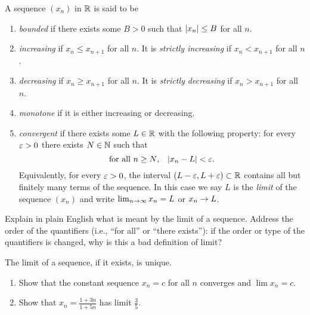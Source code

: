 \documentclass{book}
\begin{document}
\begin{defn}
A sequence $(x_n)$ in $\mathbb{R}$ is said to be 
\begin{enumerate}
\item {\em bounded} if there exists some $B > 0$ such that $\lvert x_n\rvert \leq B$ for all $n$.
\item {\em increasing} if $x_n \leq x_{n+1}$ for all $n$. It is {\em strictly increasing} if $x_n < x_{n+1}$ for all $n$. 
\item {\em decreasing} if $x_n \geq x_{n+1}$ for all $n$. It is {\em strictly decreasing} if $x_n > x_{n+1}$ for all $n$. 
\item {\em monotone} if it is either increasing or decreasing.
\item {\em convergent} if there exists some $L \in \mathbb{R}$ with the following property: for every $\varepsilon > 0$ there exists $N \in \mathbb{N}$ such that
\[
	\text{for all $n \geq N$,} 
	\quad 
	\lvert x_n - L\rvert < \varepsilon.
\]
Equivalently, for every $\varepsilon > 0$, the interval $(L - \varepsilon, L + \varepsilon) \subset \mathbb{R}$ contains all but finitely many terms of the sequence.
In this case we say $L$ is the {\em limit} of the sequence $(x_n)$ and write 
$\lim_{n\rightarrow\infty} x_n = L$ or $x_n \rightarrow L$.
\end{enumerate}
\label{D:seq_properties}
\end{defn}

\begin{expn}
Explain in plain English what is meant by the limit of a sequence. Address the order of the quantifiers (i.e., ``for all'' or ``there exists''): if the order or type of the quantifiers is changed, why is this a bad definition of limit?
\label{Expn:limit}
\end{expn}

\begin{prop}
The limit of a sequence, if it exists, is unique.
\label{P:limit_unique}
\end{prop}


\begin{exstar}
\mbox{}
\begin{enumerate}
\item Show that the constant sequence $x_n = c$ for all $n$ converges and $\lim x_n = c$.
\item Show that $x_n = \frac{1 + 3n}{1 + 5n}$ has limit $\frac 3 5$.
\end{enumerate}
\label{Ex:1_over_n}
\end{exstar}
\end{document}
